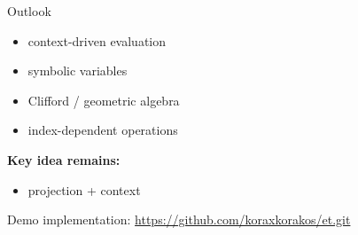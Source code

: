 \documentclass{beamer}
\begin{document}

\begin{frame}{Outlook}

\begin{itemize}
\item context-driven evaluation
\item symbolic variables
\item Clifford / geometric algebra
\item index-dependent operations
\end{itemize}

\vspace{1em}

\textbf{Key idea remains:}

\begin{itemize}
\item projection + context
\end{itemize}


\vfill
{\tiny Demo implementation: \url{https://github.com/koraxkorakos/et.git}}
\end{frame}
\end{document}
